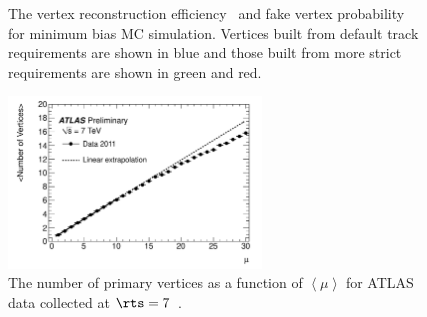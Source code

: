 \begin{figure}[h]
  \centering
  \caption{The vertex reconstruction
  efficiency~ and fake vertex
  probability~ for minimum
  bias MC simulation. Vertices built from default track requirements
  are shown in blue and those built from more strict requirements are
  shown in green and red.\cite{bib:2012jma}}
  \label{chap:reconstruction:fig:vtx_mu}
\end{figure}

\begin{figure}[h]
  \centering
  \includegraphics[width=0.6\textwidth]{fig/reconstruction/mu_v_Nvxt.pdf}
   \caption{The number of primary vertices as a function of $\left \langle \mu \right \rangle$ for
  ATLAS data collected at $\rts=7$~\tev.}
  \label{chap:reconstruction:fig:mu_nvtx}
\end{figure}
